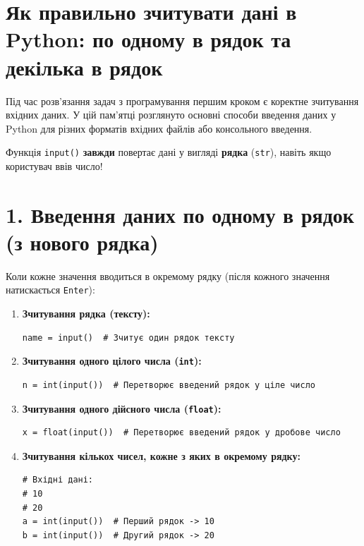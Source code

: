 \documentclass{scrreprt}
\begin{document}
	
	
	{\large
		\section*{Як правильно зчитувати дані в Python: по одному в рядок та декілька в рядок}
		
		Під час розв'язання задач з програмування першим кроком є коректне зчитування вхідних даних. У цій пам'ятці розглянуто основні способи введення даних у Python для різних форматів вхідних файлів або консольного введення.
		
		\vspace{0.3cm}
		
		\begin{tcolorbox}[colback=pyblue!5!white,colframe=pyblue,title=\textbf{Головне правило Python},fonttitle=\sffamily\bfseries]
			Функція \texttt{input()} \textbf{завжди} повертає дані у вигляді \textbf{рядка} (\texttt{str}), навіть якщо користувач ввів число!
		\end{tcolorbox}
	}
	
	\vspace{0.5cm}
	
	\section*{1. Введення даних по одному в рядок (з нового рядка)}
	
	Коли кожне значення вводиться в окремому рядку (після кожного значення натискається \texttt{Enter}):
	
	\begin{enumerate}[label=\arabic*.]
		\item \textbf{Зчитування рядка (тексту):}
\begin{verbatim}
name = input()  # Зчитує один рядок тексту
\end{verbatim}

		\item \textbf{Зчитування одного цілого числа (\texttt{int}):}
\begin{verbatim}
n = int(input())  # Перетворює введений рядок у ціле число
\end{verbatim}

		\item \textbf{Зчитування одного дійсного числа (\texttt{float}):}
\begin{verbatim}
x = float(input())  # Перетворює введений рядок у дробове число
\end{verbatim}

		\item \textbf{Зчитування кількох чисел, кожне з яких в окремому рядку:}
\begin{verbatim}
# Вхідні дані:
# 10
# 20
a = int(input())  # Перший рядок -> 10
b = int(input())  # Другий рядок -> 20
\end{verbatim}
	\end{enumerate}
\end{document}
